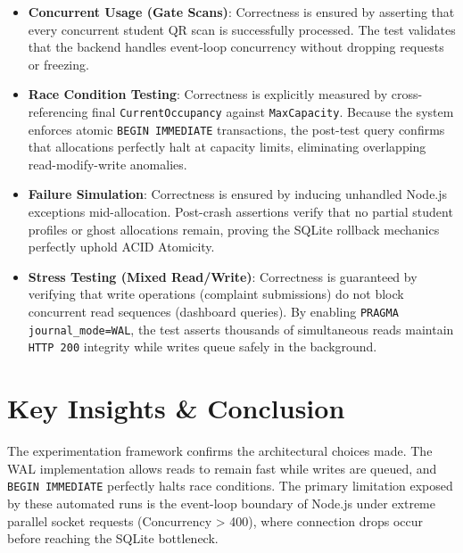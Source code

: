 \documentclass[sigconf]{acmart}
\begin{document}
\begin{itemize}
    \item \textbf{Concurrent Usage (Gate Scans)}: Correctness is ensured by asserting that every concurrent student QR scan is successfully processed. The test validates that the backend handles event-loop concurrency without dropping requests or freezing.
    \item \textbf{Race Condition Testing}: Correctness is explicitly measured by cross-referencing final \texttt{CurrentOccupancy} against \texttt{MaxCapacity}. Because the system enforces atomic \texttt{BEGIN IMMEDIATE} transactions, the post-test query confirms that allocations perfectly halt at capacity limits, eliminating overlapping read-modify-write anomalies.
    \item \textbf{Failure Simulation}: Correctness is ensured by inducing unhandled Node.js exceptions mid-allocation. Post-crash assertions verify that no partial student profiles or ghost allocations remain, proving the SQLite rollback mechanics perfectly uphold ACID Atomicity.
    \item \textbf{Stress Testing (Mixed Read/Write)}: Correctness is guaranteed by verifying that write operations (complaint submissions) do not block concurrent read sequences (dashboard queries). By enabling \texttt{PRAGMA journal\_mode=WAL}, the test asserts thousands of simultaneous reads maintain \texttt{HTTP 200} integrity while writes queue safely in the background.
\end{itemize}

\section{Key Insights \& Conclusion}
The experimentation framework confirms the architectural choices made. The WAL implementation allows reads to remain fast while writes are queued, and \texttt{BEGIN IMMEDIATE} perfectly halts race conditions. The primary limitation exposed by these automated runs is the event-loop boundary of Node.js under extreme parallel socket requests (Concurrency > 400), where connection drops occur before reaching the SQLite bottleneck.
\end{document}
